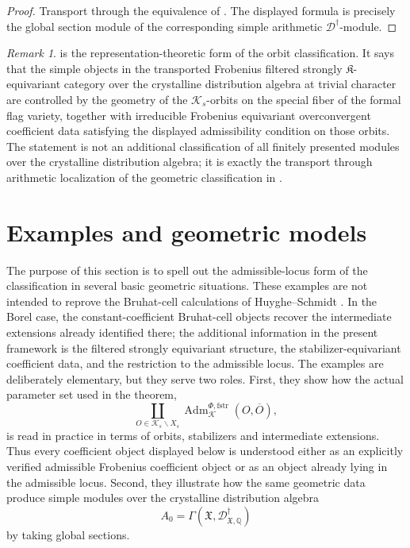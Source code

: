 \documentclass[11pt]{amsart}
\theoremstyle{plain}
\theoremstyle{definition}
\theoremstyle{remark}
\newtheorem{remark}{Remark}[section]
\newcommand{\fstr}{\mathrm{fstr}}
\newcommand{\Adm}{\operatorname{Adm}}
\begin{document}
\begin{proof}
Transport  through the equivalence of
. The displayed formula is precisely the
global section module of the corresponding simple arithmetic
\(\mathscr D^\dagger\)-module.
\end{proof}

\begin{remark}
\label{rem:distribution-side-interpretation}
 is the representation-theoretic form of
the orbit classification. It says that the simple objects in the transported
Frobenius filtered strongly \(\mathfrak K\)-equivariant category over the
crystalline distribution algebra at trivial character are controlled by the
geometry of the \(\mathcal K_s\)-orbits on the special fiber of the formal flag
variety, together with irreducible Frobenius equivariant overconvergent
coefficient data satisfying the displayed admissibility condition on those
orbits.  The statement is not an additional classification of all finitely
presented modules over the crystalline distribution algebra; it is exactly the
transport through arithmetic localization of the geometric classification in
.
\end{remark}

\section{Examples and geometric models}
\label{sec:examples}

The purpose of this section is to spell out the admissible-locus form of the
classification in several basic geometric situations.  These examples are not
intended to reprove the Bruhat-cell calculations of Huyghe--Schmidt
\cite[Section~5]{HuygheSchmidtIntermediate}.  In the Borel case, the
constant-coefficient Bruhat-cell objects recover the intermediate extensions
already identified there; the additional information in the present framework
is the filtered strongly equivariant structure, the stabilizer-equivariant
coefficient data, and the restriction to the admissible locus.  The examples
are deliberately elementary, but they serve two roles. First, they show how the
actual parameter set used in the theorem,
\[
  \coprod_{O\in \mathcal K_s\backslash X_s}
  \Adm^{\Phi,\fstr}_{\mathcal K}(O,\overline O),
\]
is read in practice in terms of orbits, stabilizers and intermediate
extensions.  Thus every coefficient object displayed below is understood either
as an explicitly verified admissible Frobenius coefficient object or as an
object already lying in the admissible locus.  Second, they illustrate how the same geometric data produce simple
modules over the crystalline distribution algebra
\[
  A_0=\Gamma(\mathfrak X,\mathscr D^\dagger_{\mathfrak X,\mathbb Q})
\]
by taking global sections.
\end{document}
